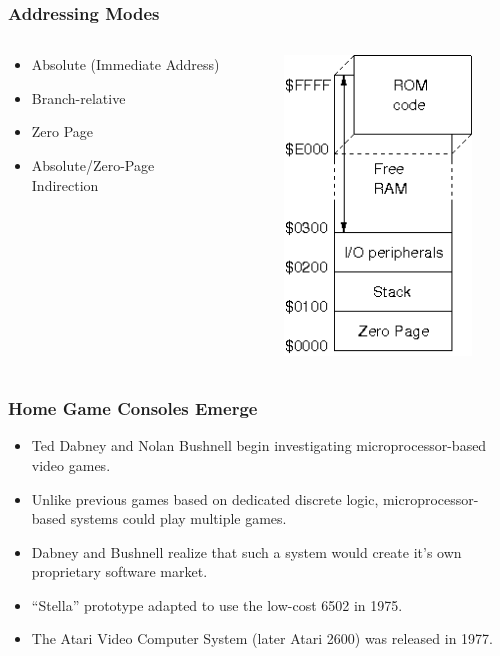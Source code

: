 \documentclass{beamer}
\begin{document}
\begin{frame}
\frametitle{Addressing Modes}
\begin{columns}[T]
\begin{column}[T]{0.5\textwidth}
\begin{itemize}
\item Absolute (Immediate Address)
\item Branch-relative
\item Zero Page
\item Absolute/Zero-Page Indirection
\end{itemize}
\end{column}
\begin{column}[T]{0.5\textwidth}
\begin{figure}
\centering
\includegraphics[scale=0.6]{images/mmap.png}
\end{figure}
\end{column}
\end{columns}
\end{frame}

\begin{frame}
\frametitle{Home Game Consoles Emerge}
\begin{itemize}
\item Ted Dabney and Nolan Bushnell begin investigating microprocessor-based video games.
\item Unlike previous games based on dedicated discrete logic, microprocessor-based systems could play multiple games.
\item Dabney and Bushnell realize that such a system would create it's own proprietary software market.
\item ``Stella'' prototype adapted to use the low-cost 6502 in 1975.
\item The Atari Video Computer System (later Atari 2600) was released in 1977.
\end{itemize}
\end{frame}
\end{document}
